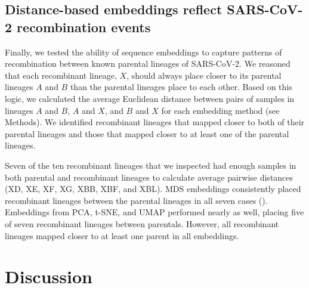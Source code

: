 \documentclass[10pt,letterpaper]{article}
\begin{document}
\subsection*{Distance-based embeddings reflect SARS-CoV-2 recombination events}

Finally, we tested the ability of sequence embeddings to capture patterns of recombination between known parental lineages of SARS-CoV-2.
We reasoned that each recombinant lineage, $X$, should always place closer to its parental lineages $A$ and $B$ than the parental lineages place to each other.
Based on this logic, we calculated the average Euclidean distance between pairs of samples in lineages $A$ and $B$, $A$ and $X$, and $B$ and $X$ for each embedding method (see Methods).
We identified recombinant lineages that mapped closer to both of their parental lineages and those that mapped closer to at least one of the parental lineages.

Seven of the ten recombinant lineages that we inspected had enough samples in both parental and recombinant lineages to calculate average pairwise distances (XD, XE, XF, XG, XBB, XBF, and XBL).
MDS embeddings consistently placed recombinant lineages between the parental lineages in all seven cases ().
Embeddings from PCA, t-SNE, and UMAP performed nearly as well, placing five of seven recombinant lineages between parentals.
However, all recombinant lineages mapped closer to at least one parent in all embeddings.

\section*{Discussion}
\end{document}
